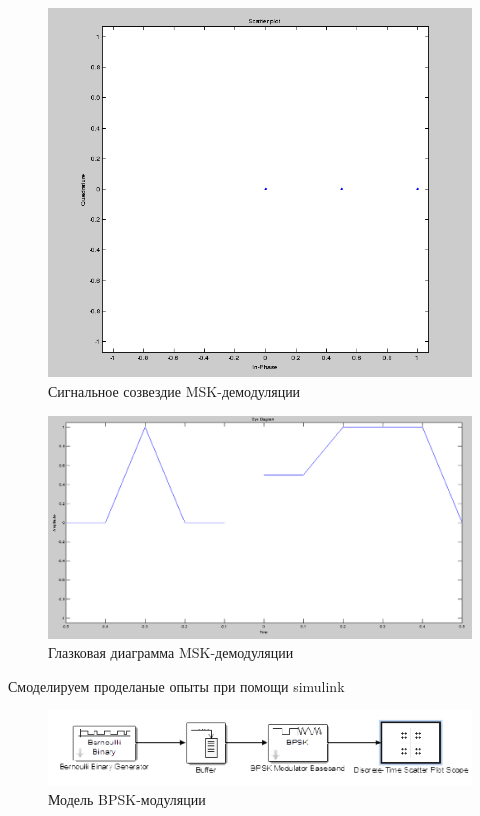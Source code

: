 \begin{figure}[H]
\includegraphics[width=150mm, scale = 0.9]{lab9/9_19}
   \caption{Сигнальное созвездие MSK-демодуляции}
\end{figure}



\begin{figure}[H]
\includegraphics[width=150mm, scale = 0.9]{lab9/9_20}
   \caption{Глазковая диаграмма MSK-демодуляции}
\end{figure}



Смоделируем проделаные опыты при помощи simulink

\begin{figure}[H]
\includegraphics[width=150mm, scale = 0.9]{lab9/9_21}
   \caption{Модель BPSK-модуляции}
\end{figure}



